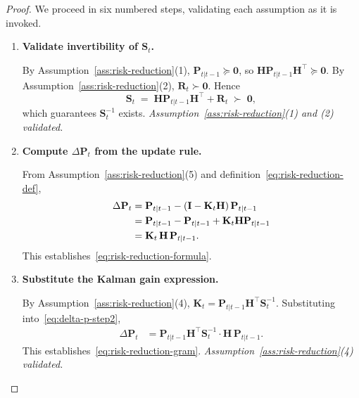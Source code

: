 \documentclass[12pt,openany]{book}
\numberwithin{equation}{chapter}
\theoremstyle{plain}
\theoremstyle{definition}
\theoremstyle{remark}
\begin{document}
\begin{proof}
We proceed in six numbered steps, validating each assumption as it
is invoked.

\begin{enumerate}

  \item \textbf{Validate invertibility of $\mathbf{S}_t$.}

  By Assumption~\ref{ass:risk-reduction}(1),
  $\mathbf{P}_{t|t-1} \succeq \mathbf{0}$, so
  $\mathbf{H}\mathbf{P}_{t|t-1}\mathbf{H}^\top \succeq \mathbf{0}$.
  By Assumption~\ref{ass:risk-reduction}(2),
  $\mathbf{R}_t \succ \mathbf{0}$.
  Hence
  \begin{equation}
    \mathbf{S}_t
    \;=\; \mathbf{H}\mathbf{P}_{t|t-1}\mathbf{H}^\top + \mathbf{R}_t
    \;\succ\; \mathbf{0},
    \label{eq:St-pd}
  \end{equation}
  which guarantees $\mathbf{S}_t^{-1}$ exists.
  \textit{Assumption~\ref{ass:risk-reduction}(1) and (2) validated.}

  \item \textbf{Compute $\Delta\mathbf{P}_t$ from the update rule.}

  From Assumption~\ref{ass:risk-reduction}(5) and
  definition~\eqref{eq:risk-reduction-def},
  \begin{align}
    \Delta\mathbf{P}_t
    &= \mathbf{P}_{t|t-1}
       - (\mathbf{I} - \mathbf{K}_t\mathbf{H})\,\mathbf{P}_{t|t-1}
       \notag \\
    &= \mathbf{P}_{t|t-1}
       - \mathbf{P}_{t|t-1}
       + \mathbf{K}_t\mathbf{H}\mathbf{P}_{t|t-1}
       \notag \\
    &= \mathbf{K}_t\,\mathbf{H}\,\mathbf{P}_{t|t-1}.
    \label{eq:delta-p-step2}
  \end{align}
  This establishes~\eqref{eq:risk-reduction-formula}.

  \item \textbf{Substitute the Kalman gain expression.}

  By Assumption~\ref{ass:risk-reduction}(4),
  $\mathbf{K}_t = \mathbf{P}_{t|t-1}\mathbf{H}^\top\mathbf{S}_t^{-1}$.
  Substituting into~\eqref{eq:delta-p-step2},
  \begin{align}
    \Delta\mathbf{P}_t
    &= \mathbf{P}_{t|t-1}\mathbf{H}^\top\mathbf{S}_t^{-1}
       \cdot \mathbf{H}\,\mathbf{P}_{t|t-1}.
    \label{eq:delta-p-step3}
  \end{align}
  This establishes~\eqref{eq:risk-reduction-gram}.
  \textit{Assumption~\ref{ass:risk-reduction}(4) validated.}


\end{enumerate}
\end{proof}
\end{document}

